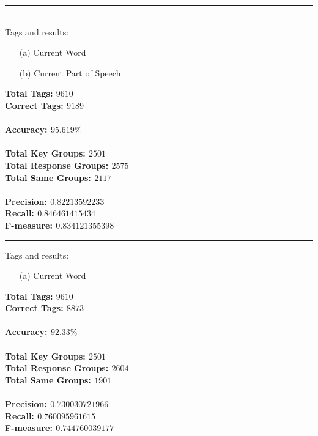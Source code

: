 \noindent\rule{15cm}{0.4pt}
\\
Tags and results:
\begin{itemize}
\item[(a)] Current Word
\item[(b)] Current Part of Speech
\end{itemize}
\large{
\textbf{Total Tags: $9610$} \\
\textbf{Correct Tags: $9189$} \\
\\
\textbf{Accuracy: $95.619\%$} \\
\\
\textbf{Total Key Groups: $2501$} \\
\textbf{Total Response Groups: $2575$} \\
\textbf{Total Same Groups: $2117$} \\
\\
\textbf{Precision: $0.82213592233$} \\
\textbf{Recall: $0.846461415434$} \\
\textbf{F-measure: $0.834121355398$} \\
}

\noindent\rule{15cm}{0.4pt}

Tags and results:
\begin{itemize}
\item[(a)] Current Word
\end{itemize}
\large{
\textbf{Total Tags: $9610$} \\
\textbf{Correct Tags: $8873$} \\
\\
\textbf{Accuracy: $92.33\%$} \\
\\
\textbf{Total Key Groups: $2501$} \\
\textbf{Total Response Groups: $2604$} \\
\textbf{Total Same Groups: $1901$} \\
\\
\textbf{Precision: $0.730030721966$} \\
\textbf{Recall: $0.760095961615$} \\
\textbf{F-measure: $0.744760039177$} \\
}

